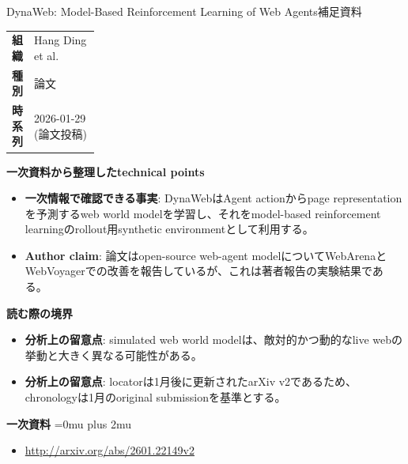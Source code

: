 \begin{technicalnote}{DynaWeb: Model-Based Reinforcement Learning of Web Agents}{補足資料}
\begingroup
\begin{tabularx}{\linewidth}{@{}>{\bfseries}p{0.22\linewidth}X@{}}
組織 & Hang Ding et al. \\
種別 & 論文 \\
時系列 & 2026-01-29 (論文投稿) \\
\end{tabularx}
\smallskip
{\bfseries 一次資料から整理したtechnical points}
\begin{itemize}[leftmargin=1.5em,itemsep=0.35em]
\item \textbf{一次情報で確認できる事実}: DynaWebはAgent actionからpage representationを予測するweb world modelを学習し、それをmodel-based reinforcement learningのrollout用synthetic environmentとして利用する。
\item \textbf{Author claim}: 論文はopen-source web-agent modelについてWebArenaとWebVoyagerでの改善を報告しているが、これは著者報告の実験結果である。
\end{itemize}
\begin{minipage}{\linewidth}
{\bfseries 読む際の境界}
\begin{itemize}[leftmargin=1.5em,itemsep=0.35em]
\item \textbf{分析上の留意点}: simulated web world modelは、敵対的かつ動的なlive webの挙動と大きく異なる可能性がある。
\item \textbf{分析上の留意点}: locatorは1月後に更新されたarXiv v2であるため、chronologyは1月のoriginal submissionを基準とする。
\end{itemize}
\begin{samepage}
{\bfseries 一次資料}
\begingroup\sloppy
\Urlmuskip=0mu plus 2mu\relax
\begin{itemize}[leftmargin=1.5em,itemsep=0.25em]
\item {\scriptsize\url{http://arxiv.org/abs/2601.22149v2}}
\end{itemize}
\endgroup
\end{samepage}
\end{minipage}
\endgroup
\end{technicalnote}
\medskip

